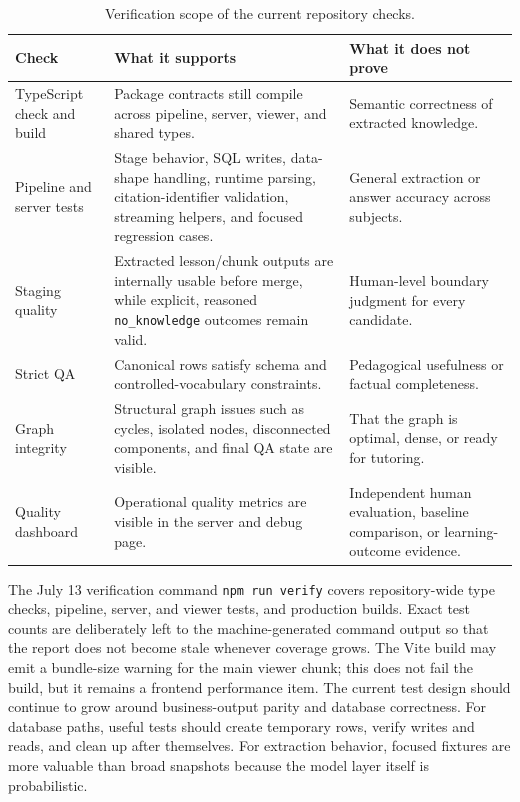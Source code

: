 \documentclass[11pt,letterpaper]{article}
\newcommand{\code}[1]{\nolinkurl{#1}}
\begin{document}
\begin{table}[H]
\centering
\small
\begin{tabularx}{\textwidth}{@{}lYY@{}}
\toprule
\textbf{Check} & \textbf{What it supports} & \textbf{What it does not prove}\\
\midrule
TypeScript check and build & Package contracts still compile across pipeline, server, viewer, and shared types. & Semantic correctness of extracted knowledge.\\
Pipeline and server tests & Stage behavior, SQL writes, data-shape handling, runtime parsing, citation-identifier validation, streaming helpers, and focused regression cases. & General extraction or answer accuracy across subjects.\\
Staging quality & Extracted lesson/chunk outputs are internally usable before merge, while explicit, reasoned \code{no_knowledge} outcomes remain valid. & Human-level boundary judgment for every candidate.\\
Strict QA & Canonical rows satisfy schema and controlled-vocabulary constraints. & Pedagogical usefulness or factual completeness.\\
Graph integrity & Structural graph issues such as cycles, isolated nodes, disconnected components, and final QA state are visible. & That the graph is optimal, dense, or ready for tutoring.\\
Quality dashboard & Operational quality metrics are visible in the server and debug page. & Independent human evaluation, baseline comparison, or learning-outcome evidence.\\
\bottomrule
\end{tabularx}
\caption{Verification scope of the current repository checks.}
\end{table}

The July 13 verification command \code{npm run verify} covers repository-wide type checks, pipeline, server, and viewer tests, and production builds. Exact test counts are deliberately left to the machine-generated command output so that the report does not become stale whenever coverage grows. The Vite build may emit a bundle-size warning for the main viewer chunk; this does not fail the build, but it remains a frontend performance item. The current test design should continue to grow around business-output parity and database correctness. For database paths, useful tests should create temporary rows, verify writes and reads, and clean up after themselves. For extraction behavior, focused fixtures are more valuable than broad snapshots because the model layer itself is probabilistic.
\end{document}
